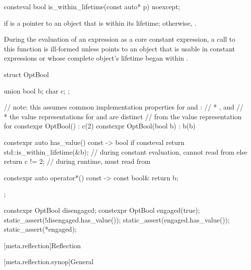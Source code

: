 %
\begin{itemdecl}
consteval bool is_within_lifetime(const auto* p) noexcept;
\end{itemdecl}

\begin{itemdescr}
\pnum
\returns
{} if  is a pointer to an object that is
within its lifetime; otherwise, .

\pnum
\remarks
During the evaluation of an expression  as a core constant expression,
a call to this function is ill-formed
unless  points to an object that is usable
in constant expressions or
whose complete object's lifetime began within .

\pnum
\begin{example}
\begin{codeblock}
struct OptBool {
  union { bool b; char c; };

  // note: this assumes common implementation properties for  and :
  // * , and
  // * the value representations for  and  are distinct
  //   from the value representation for 
  constexpr OptBool() : c(2) { }
  constexpr OptBool(bool b) : b(b) { }

  constexpr auto has_value() const -> bool {
    if consteval {
      return std::is_within_lifetime(&b);       // during constant evaluation, cannot read from 
    } else {
      return c != 2;                            // during runtime, must read from 
    }
  }

  constexpr auto operator*() const -> const bool& {
    return b;
  }
};

constexpr OptBool disengaged;
constexpr OptBool engaged(true);
static_assert(!disengaged.has_value());
static_assert(engaged.has_value());
static_assert(*engaged);
\end{codeblock}
\end{example}
\end{itemdescr}

[meta.reflection]{Reflection}

[meta.reflection.synop]{General}
%

